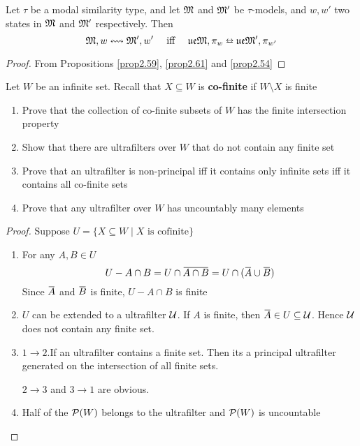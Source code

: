 \documentclass[11pt]{article}
\newcommand{\ue}{\fu\fe}
\begin{document}
\begin{theorem}[]
Let \(\tau\) be a modal similarity type, and let \(\mathfrak{M}\) and \(\mathfrak{M}'\) be
\(\tau\)-models, and \(w,w'\) two states in \(\mathfrak{M}\) and \(\mathfrak{M}'\) respectively.
Then
\begin{equation*}
\fM,w\leftrightsquigarrow \fM',w' \quad\text{ iff }\quad
\ue\fM,\pi_w\leftrightarroweq\ue\fM',\pi_{w'}
\end{equation*}
\end{theorem}

\begin{proof}
From Propositions \ref{prop2.59}, \ref{prop2.61} and \ref{prop2.54}
\end{proof}


\begin{exercise}
\label{ex2.5.4}
Let \(W\) be an infinite set. Recall that \(X\subseteq W\) is \textbf{co-finite} if
\(W\setminus X\) is finite
\begin{enumerate}
\item Prove that the collection of co-finite subsets of \(W\) has the finite
intersection property
\item Show that there are ultrafilters over \(W\) that do not contain any
finite set
\item Prove that an ultrafilter is non-principal iff it contains only infinite
sets iff it contains all co-finite sets
\item Prove that any ultrafilter over \(W\) has uncountably many elements
\end{enumerate}
\end{exercise}



\begin{proof}
Suppose \(U=\{X\subseteq W\mid X\text{ is cofinite}\}\)
\begin{enumerate}
\item For any \(A,B\in U\)
\begin{equation*}
U-A\cap B=U\cap\bbar{A\cap B}=U\cap(\bbar{A}\cup\bbar{B})
\end{equation*}
Since \(\bbar{A}\) and \(\bbar{B}\) is finite, \(U-A\cap B\) is finite
\item \(U\) can be extended to a ultrafilter \(\mathcal{U}\). If \(A\) is finite, then
\(\bbar{A}\in U\subseteq\calu\). Hence \(\mathcal{U}\) does not contain any
finite set.
\item \(1\to 2\).If an ultrafilter contains a finite set. Then its a principal ultrafilter
generated on the intersection of all finite sets.

\(2\to3\) and \(3\to1\) are obvious.
\item Half of the \(\mathcal{P}(W)\) belongs to the ultrafilter and \(\mathcal{P}(W)\) is uncountable
\end{enumerate}
\end{proof}
\end{document}
